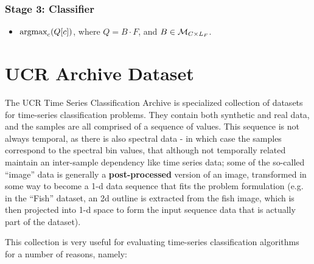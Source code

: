 \subsubsection{Stage 3: Classifier}\label{sec:ha_s3}
\begin{itemize}
    \item $\text{argmax}\sb{c} (Q[c])$, where $Q = B \cdot F$, and  $B \in \mathcal{M}\sb{C \times L_F}$.
\end{itemize}

\section{UCR Archive Dataset}
The UCR Time Series Classification Archive \cite{UCRArchive2018} is specialized collection of datasets for time-series classification problems. 
They contain both synthetic and real data, and the samples are all comprised of a sequence of values. This sequence is not always temporal, as there is also
spectral data - in which case the samples correspond to the spectral bin values, that although not temporally related maintain an inter-sample dependency like time series data;
some of the so-called ``image'' data is generally a \textbf{post-processed} version of an image, transformed in some way to become a 1-d data sequence that fits the problem formulation 
(e.g. in the ``Fish'' dataset, an 2d outline is extracted from the fish image, which is then projected into 1-d space to form the input sequence data that is actually part of the dataset).

This collection is very useful for evaluating time-series classification algorithms for a number of reasons, namely:

